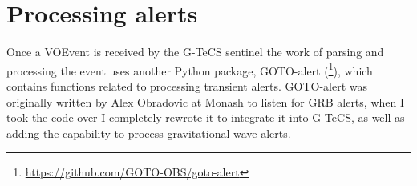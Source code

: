 
\section{Processing alerts}
\label{sec:gotoalert}


\begin{colsection}

Once a VOEvent is received by the G-TeCS sentinel the work of parsing and processing the event uses another Python package, GOTO-alert (\footnote{\url{https://github.com/GOTO-OBS/goto-alert}}), which  contains functions related to processing transient alerts. GOTO-alert was originally written by Alex Obradovic at Monash to listen for GRB alerts, when I took the code over I completely rewrote it to integrate it into G-TeCS, as well as adding the capability to process gravitational-wave alerts.

\end{colsection}


